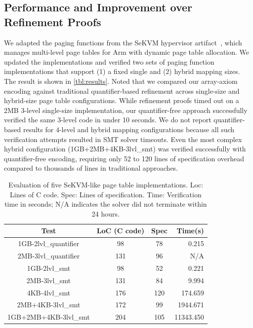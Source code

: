 \documentclass[sigplan,nonacm,10pt]{acmart}
\begin{document}
\subsection*{Performance and Improvement over Refinement Proofs}
We adapted the paging functions from the SeKVM hypervisor artifact~\cite {sekvm-artifact-sosp21}, which manages multi-level page tables for Arm with dynamic page table allocation.
We updated the implementations and verified two sets of paging function implementations that support (1) a fixed single and (2) hybrid mapping sizes. The result is shown in \autoref{tbl:results}. Noted that we compared our array-axiom encoding against traditional quantifier-based refinement across single-size and hybrid-size page table configurations. While refinement proofs timed out on a 2MB 3-level single-size implementation, our quantifier-free approach successfully verified the same 3-level code in under 10 seconds. We do not report quantifier-based results for 4-level and hybrid mapping configurations because all such verification attempts resulted in SMT solver timeouts. Even the most complex hybrid configuration (1GB+2MB+4KB-3lvl\_smt) was verified successfully with quantifier-free encoding, requiring only 52 to 120 lines of specification overhead compared to thousands of lines in traditional approaches.

\begin{table}
\centering
\caption{Evaluation of five SeKVM-like page table implementations. Loc: Lines of C code. Spec: Lines of specification. Time: Verification time in seconds; N/A indicates the solver did not terminate within 24 hours.}
\label{tbl:results}
{\footnotesize
 \begin{tabular}{cccr}
 \toprule
 \footnotesize
 \textbf{Test} & \textbf{LoC (C code)} & \textbf{Spec} & \textbf{Time(s)} \\
 \midrule
 1GB-2lvl\_quantifier & 98 & 78 & 0.215\\
 \midrule
 2MB-3lvl\_quantifier & 131 & 96 & N/A\\
 
 \midrule
 1GB-2lvl\_smt & 98 & 52 & 0.221 \\
 \midrule
 2MB-3lvl\_smt & 131 & 84 & 9.994 \\
 \midrule
 4KB-4lvl\_smt & 176 & 120 & 174.659\\
 \midrule
 2MB+4KB-3lvl\_smt & 172 & 99 & 1944.671 \\
  \midrule
 1GB+2MB+4KB-3lvl\_smt & 204 & 105 & 11343.450 \\
 \bottomrule
 \end{tabular}}
\end{table}
\end{document}
